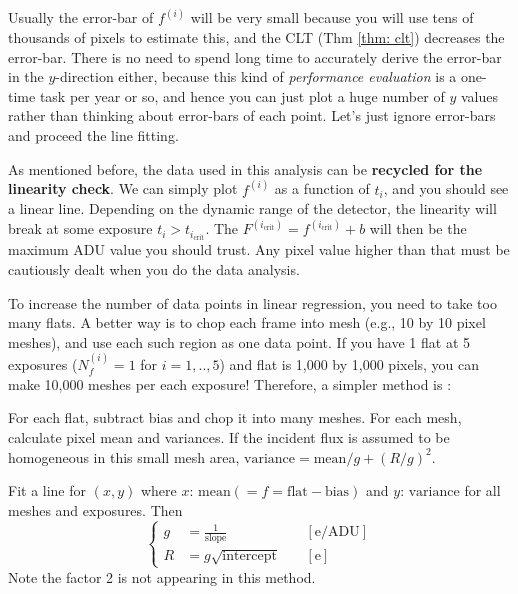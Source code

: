 Usually the error-bar of $ f^{(i)} $ will be very small because you will use tens of thousands of pixels to estimate this, and the CLT (Thm \ref{thm: clt}) decreases the error-bar. There is no need to spend long time to accurately derive the error-bar in the $ y $-direction either, because this kind of \textit{performance evaluation} is a one-time task per year or so, and hence you can just plot a huge number of $ y $ values rather than thinking about error-bars of each point. Let's just ignore error-bars and proceed the line fitting.

As mentioned before, the data used in this analysis can be \textbf{recycled for the linearity check}. We can simply plot $ f^{(i)} $ as a function of $ t_i $, and you should see a linear line. Depending on the dynamic range of the detector, the linearity will break at some exposure $ t_i > t_{i_\mathrm{crit}} $. The $ F^{(i_\mathrm{crit})} = f^{(i_\mathrm{crit})} + b $ will then be the maximum ADU value you should trust. Any pixel value higher than that must be cautiously dealt when you do the data analysis.


To increase the number of data points in linear regression, you need to take too many flats. A better way is to chop each frame into mesh (e.g., 10 by 10 pixel meshes), and use each such region as one data point. If you have 1 flat at 5 exposures ($ N_f^{(i)} = 1 $ for $ i = 1, .., 5 $) and flat is 1,000 by 1,000 pixels, you can make 10,000 meshes per each exposure! Therefore, a simpler method is :

\begin{thm} 
For each flat, subtract bias and chop it into many meshes. For each mesh, calculate pixel mean and variances. If the incident flux is assumed to be homogeneous in this small mesh area, $ \mathrm{variance} = \mathrm{mean}/g + (R/g)^2 $.

Fit a line for $ (x, y) $ where $ x $: $ \mathrm{mean} (= f = \mathrm{flat} - \mathrm{bias}) $ and $ y $: $ \mathrm{variance} $ for all meshes and exposures. Then
\begin{equation}
  \left \{
  \begin{aligned}
    g &= \frac{1}{\mathrm{slope}} &&~\mathrm{[e/ADU]} \\
    R &= g \sqrt{\mathrm{intercept}} &&~\mathrm{[e]}
  \end{aligned}
  \right .
\end{equation}
Note the factor 2 is not appearing in this method.
\end{thm}


